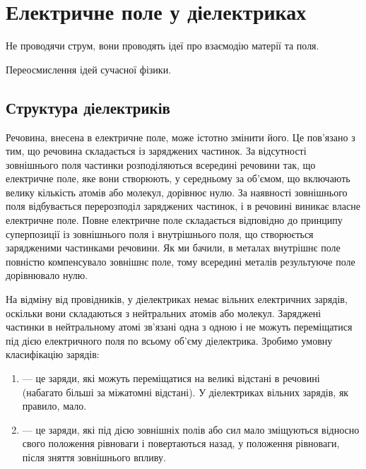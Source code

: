
\chapter{Електричне поле у діелектриках}\label{\currfilebase}
\graphicspath{{\currfilebase/Pictures}}
\epigraph{\Alexander  Не проводячи струм, вони проводять ідеї про взаємодію матерії та поля.
}{Переосмислення ідей сучасної фізики.}




\section{Структура діелектриків}

Речовина, внесена в електричне поле, може істотно змінити його. Це пов'язано з тим, що речовина складається із заряджених частинок. За відсутності
зовнішнього поля частинки розподіляються всередині речовини так, що електричне поле, яке вони створюють, у середньому за об'ємом, що включають велику
кількість атомів або молекул, дорівнює нулю. За наявності зовнішнього поля відбувається перерозподіл заряджених частинок, і в речовині виникає власне
електричне поле. Повне електричне поле складається відповідно до принципу суперпозиції із зовнішнього поля і внутрішнього поля, що створюється
зарядженими частинками речовини. Як ми бачили, в металах внутрішнє поле повністю компенсувало зовнішнє поле, тому всередині металів результуюче поле
дорівнювало нулю.


На відміну від провідників, у діелектриках немає вільних електричних зарядів, оскільки вони складаються з нейтральних атомів або молекул. Заряджені
частинки в нейтральному атомі зв'язані одна з одною і не можуть переміщатися під дією електричного поля по всьому об'єму діелектрика. Зробимо умовну
класифікацію зарядів:
\begin{enumerate}
    \item {} --- це заряди, які можуть переміщатися на великі відстані в речовині
    (набагато більші за міжатомні відстані). У діелектриках вільних зарядів, як правило, мало.
    \item {} --- це заряди, які під дією зовнішніх полів або сил мало
    зміщуються відносно свого положення рівноваги і повертаються назад, у положення рівноваги, після
    зняття зовнішнього впливу.
\end{enumerate}


